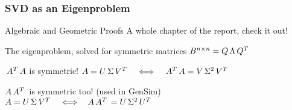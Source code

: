 \begin{frame}[plain]
	\frametitle{SVD as an Eigenproblem}
	\begin{block}{Algebraic and Geometric Proofs}
    A whole chapter of the report, check it out!
	\end{block}   
	\begin{block}{The eigenproblem, solved for symmetric matrices}
    $B^{n \times n} = Q\,\Lambda\,{Q}^{T}\,$
	\end{block}
	\begin{block}{$\,{A}^{T}\,A$ is symmetric!}
    $A = U\, \Sigma \,{V}^{T}\, \,\,\,\,\iff\,\,\,\, \,{A}^{T}\,A = V\, \Sigma^2 \,{V}^{T}\,$
	\end{block}   
	\begin{block}{$A\,{A}^{T}\,$ is symmetric too! (used in GenSim)}
    $A = U\, \Sigma \,{V}^{T}\, \,\,\,\,\iff\,\,\,\, A\,{A}^{T}\, = U\, \Sigma^2 \,{U}^{T}\,$
	\end{block}
\end{frame}
